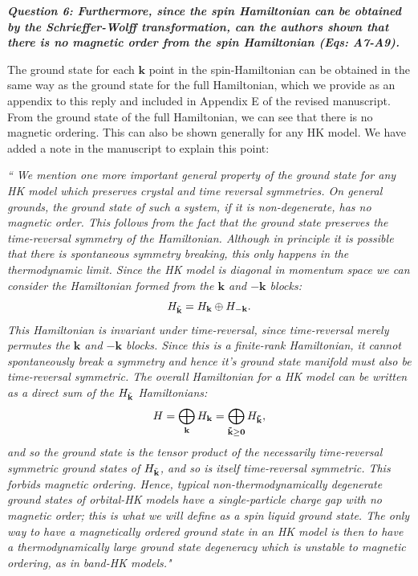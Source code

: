 \documentclass[aps,reprint,notitlepage,onecolumn,12pt]{revtex4-2}
\numberwithin{equation}{section}
\begin{document}
\textbf{\textit{Question 6: Furthermore, since the spin Hamiltonian can be obtained by the Schrieffer-Wolff transformation, can the authors shown that there is no magnetic order from the spin Hamiltonian (Eqs: A7-A9).}}

The ground state for each $\mathbf{k}$ point in the spin-Hamiltonian can be obtained in the same way as the ground state for the full Hamiltonian, which we provide as an appendix to this reply and included in Appendix E of the revised manuscript.
From the ground state of the full Hamiltonian, we can see that there is no magnetic ordering. This can also be shown generally for any HK model. We have added a note in the manuscript to explain this point:

\textit{`` We mention one more important general property of the ground state for \textit{any} HK model which preserves crystal and time reversal symmetries. On general grounds, the ground state of such a system, if it is non-degenerate, has no magnetic order. This follows from the fact that the ground state preserves the time-reversal symmetry of the Hamiltonian. 
Although in principle it is possible that there is spontaneous symmetry breaking, this only happens in the thermodynamic limit. 
Since the HK model is diagonal in momentum space we can consider the Hamiltonian formed from the $\mathbf{k}$ and $-\mathbf{k}$ blocks:
\begin{equation}
    H_{\Tilde{\mathbf{k}}}=H_{\mathbf{k}}\oplus H_{-\mathbf{k}}.
\end{equation}
This Hamiltonian is invariant under time-reversal, since time-reversal merely permutes the $\mathbf{k}$ and $-\mathbf{k}$ blocks. 
Since this is a finite-rank Hamiltonian, it cannot spontaneously break a symmetry and hence it's ground state manifold must also be time-reversal symmetric. 
The overall Hamiltonian for a HK model can be written as a direct sum of the $H_{\Tilde{\mathbf{k}}}$ Hamiltonians:
\begin{equation}
H=\bigoplus_{\mathbf{k}}H_{\mathbf{k}}=\bigoplus_{\mathbf{\tilde{k}\geq 0}}H_{\mathbf{\Tilde{k}}},
\end{equation}
and so the ground state is the tensor product of the necessarily time-reversal symmetric ground states of $H_{\Tilde{\mathbf{k}}}$, and so is itself time-reversal symmetric. This forbids magnetic ordering.  Hence, typical non-thermodynamically degenerate ground states of orbital-HK models have a single-particle charge gap with no magnetic order; this is what we will define as a \textit{spin liquid} ground state. The only way to have a magnetically ordered ground state in an HK model is then to have a thermodynamically large ground state degeneracy which is unstable to magnetic ordering, as in band-HK models."}\\
\end{document}
